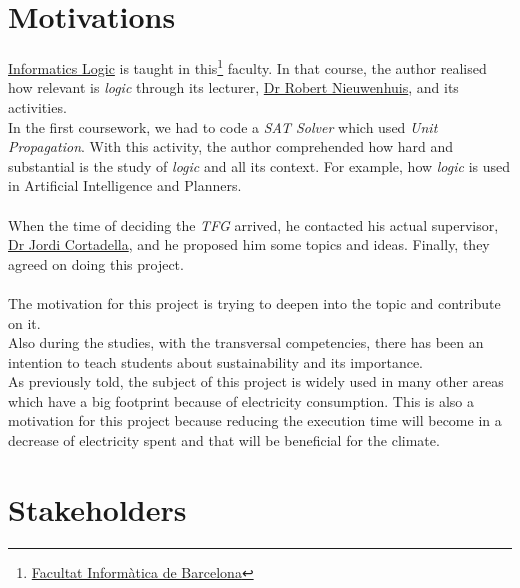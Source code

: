 



\section{Motivations}

\href{https://www.fib.upc.edu/en/studies/bachelors-degrees/bachelor-degree-informatics-engineering/curriculum/syllabus/LI}{Informatics Logic} is taught in this\footnote{\href{https://www.fib.upc.edu/en/}{Facultat Informàtica de Barcelona}} faculty. In that course, the author realised how relevant is \emph{logic} through its lecturer, \href{http://www.lsi.upc.es/~roberto/}{Dr Robert Nieuwenhuis}, and its activities. \\
In the first coursework, we had to code a \emph{SAT Solver} which used \emph{Unit Propagation}.
With this activity, the author comprehended how hard and substantial is the study of \emph{logic} and all its context. For example, how \emph{logic} is used in Artificial Intelligence and Planners.\\\\
When the time of deciding the \emph{TFG} arrived, he contacted his actual supervisor, \href{https://www.cs.upc.edu/~jordicf/}{Dr Jordi Cortadella}, and he proposed him some topics and ideas. Finally, they agreed on doing this project. \\\\
The motivation for this project is trying to deepen into the topic and contribute on it.\\
Also during the studies, with the transversal competencies, there has been an intention to teach students about sustainability and its importance.\\ %
As previously told, the subject of this project is widely used in many other areas which have a big footprint because of electricity consumption. This is also a motivation for this project because reducing the execution time will become in a decrease of electricity spent and that will be beneficial for the climate.  

\section{Stakeholders}

